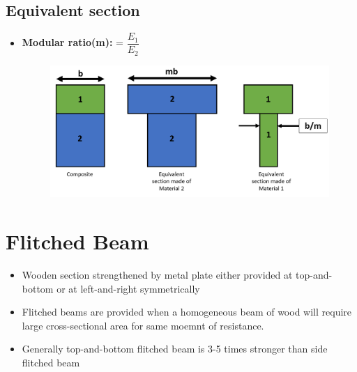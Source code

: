\documentclass[8pt]{report}
\begin{document}
	\subsection{Equivalent section}
		\begin{itemize}
			\item \textbf{Modular ratio(m):} = $\dfrac{E_1}{E_2}$
			\begin{figure}[H]
				\centering
				\includegraphics[scale=0.4]{equisection.png}
			\end{figure}
		\end{itemize}\hrulefill
	\section{Flitched Beam}
		\begin{itemize}
			\item Wooden section strengthened by metal plate either provided at top-and-bottom or at left-and-right symmetrically
			\item Flitched beams are provided when a homogeneous beam of wood will require large cross-sectional area for same moemnt of resistance. 
			\item Generally top-and-bottom flitched beam is 3-5 times stronger than side flitched beam
		\end{itemize}\hrulefill
\end{document}
